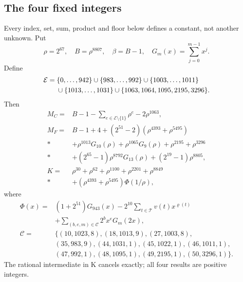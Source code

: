 \subsection{The four fixed integers}
Every index, set, sum, product and floor below defines a constant, not
another unknown. Put
\[
\rho=2^{67},\quad B=\rho^{8807},\quad\beta=B-1,\quad
G_m(x)=\sum_{j=0}^{m-1}x^j.
\]
Define
\[
\begin{split}
\mathcal E={}&\{0,\ldots,942\}\cup\{983,\ldots,992\}\cup\{1003,\ldots,1011\}\\
&\cup\{1013,\ldots,1031\}\cup\{1063,1064,1095,2195,3296\}.
\end{split}
\]
Then
\begin{align*}
M_C={}&B-1-\sum_{e\in\mathcal E\setminus\{1\}}\rho^e-2\rho^{1063},\\
M_F={}&B-1+4+(2^{51}-2)(\rho^{4393}+\rho^{5495})\\*
&+\rho^{1013}G_{10}(\rho)+\rho^{1065}G_9(\rho)
  +\rho^{2195}+\rho^{3296}\\*
&+(2^{65}-1)\rho^{8792}G_{13}(\rho)+(2^{19}-1)\rho^{8805},\\
K={}&\rho^{30}+\rho^{62}+\rho^{1100}+\rho^{2201}+\rho^{8849}\\*
&+(\rho^{4393}+\rho^{5495})\Phi(1/\rho),
\end{align*}
where
\[
\begin{split}
\Phi(x)={}&(1+2^{51})G_{943}(x)
 -2^{10}\sum_{t\in\mathcal T}v(t)x^{\varrho(t)}\\
&+\sum_{(b,e,m)\in\mathcal C}2^b x^e G_m(2x),\\
\mathcal C={}&\{(10,1023,8),(18,1013,9),(27,1003,8),\\
&(35,983,9),(44,1031,1),(45,1022,1),(46,1011,1),\\
&(47,992,1),(48,1095,1),(49,2195,1),(50,3296,1)\}.
\end{split}
\]
The rational intermediate in K cancels exactly; all four results are positive integers.


